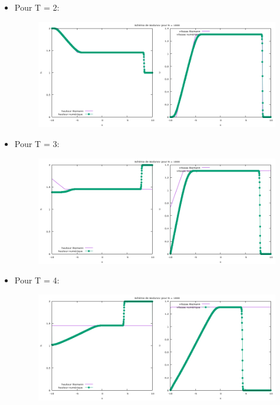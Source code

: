 \begin{itemize}
\newpage
\item Pour T = 2:

\begin{figure}[h!]
	\centering \includegraphics[scale=0.5]{Images_Fichiers/tp2rusa1000_2.png}
\end{figure}

\item Pour T = 3:

\begin{figure}[h!]
	\centering \includegraphics[scale=0.5]{Images_Fichiers/tp2rusa1000_3.png}
\end{figure}

\item Pour T = 4:

\begin{figure}[h!]
	\centering \includegraphics[scale=0.5]{Images_Fichiers/tp2rusa1000_4.png}
\end{figure}

\end{itemize}

